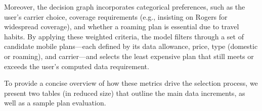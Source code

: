 \documentclass[conference]{IEEEtran}
\begin{document}
Moreover, the decision graph incorporates categorical preferences, such as the user’s carrier choice, coverage requirements (e.g., insisting on Rogers for widespread coverage), and whether a roaming plan is essential due to travel habits. By applying these weighted criteria, the model filters through a set of candidate mobile plans—each defined by its data allowance, price, type (domestic or roaming), and carrier—and selects the least expensive plan that still meets or exceeds the user’s computed data requirement.

To provide a concise overview of how these metrics drive the selection process, we present two tables (in reduced size) that outline the main data increments, as well as a sample plan evaluation.

\begin{table}[ht!]
\centering
\scriptsize
\caption{User Metrics and Calculated Data Need}
\label{tab:userMetrics}
\end{table}
\end{document}
